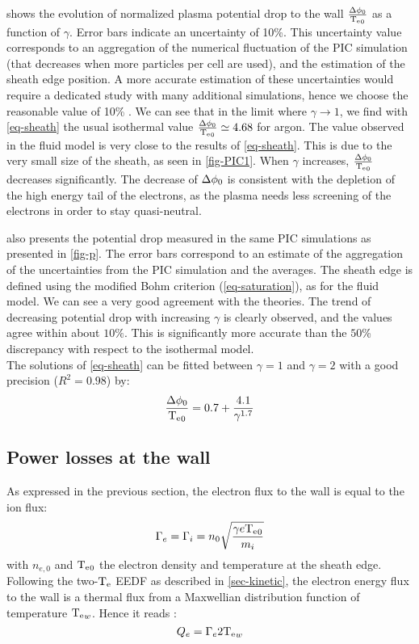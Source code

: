  shows the evolution of normalized plasma potential drop to the wall $\frac{\Delta \phi_0}{\mathrm{T_e}_0}$ as a function of $\gamma$.
{  Error bars indicate an uncertainty of 10\%.
This uncertainty value corresponds to an aggregation of the numerical fluctuation of the PIC simulation (that decreases when more particles per cell are used), and the estimation of the sheath edge position.
A more accurate estimation of these uncertainties would require a dedicated study with many additional simulations, hence we choose the reasonable value of 10\% \citep{turner2013}.}
We can see that in the limit where $\gamma \rightarrow 1$, we find with \cref{eq-sheath} the usual isothermal value $\frac{\Delta \phi_0}{\mathrm{T_e}_0}  \simeq 4.68$ for argon.
The value observed in the fluid model is very close to the results of \cref{eq-sheath}.
This is due to the very small size of the sheath, as seen in \cref{fig-PIC1}.
When $\gamma$ increases, $\frac{\Delta \phi_0}{\mathrm{T_e}_0}$ decreases significantly.
The decrease of $\Delta \phi_0$ is consistent with the depletion of the high energy tail of the electrons, as the plasma needs less screening of the electrons in order to stay quasi-neutral.

 also presents the potential drop measured in the same PIC simulations as presented in \cref{fig-p}.
The error bars correspond to an estimate of the aggregation of the uncertainties from the PIC simulation and the averages.
The sheath edge is defined using the modified Bohm criterion (\cref{eq-saturation}), as for the fluid model.
We can see a very good agreement with the theories.
The trend of decreasing potential drop with increasing $\gamma$ is clearly observed, and the values agree within about $10\%$.
This is significantly more accurate than the $50$\% discrepancy with respect to the isothermal model.\\

The solutions of \cref{eq-sheath} can be fitted between $\gamma = 1$ and $\gamma = 2$ with a good precision ($R^2 = 0.98$) by:
\begin{equation}
  \label{eq-fit}
  \frac{\Delta \phi_0}{\mathrm{T_e}_0} = 0.7 + \frac{4.1}{\gamma^{1.7}}
\end{equation}

\subsection{Power losses at the wall}

As expressed in the previous section, the electron flux to the wall is equal to the ion flux:
\begin{equation}
  \Gamma_e = \Gamma_i =  n_0 \sqrt{\frac{\gamma e \mathrm{T_e}_0}{m_i}}
\end{equation}
with $n_{e,0}$ and $\mathrm{T_e}_0$ the electron density and temperature at the sheath edge.
Following the two-$\mathrm{T_e}$ EEDF as described in \cref{sec-kinetic}, the electron energy flux to the wall is a thermal flux from a Maxwellian distribution function of temperature  $\mathrm{T_e}_w$.
Hence it reads \cite{charbertBook}:
\begin{equation}
  \label{eq-maxflux}
  Q_e = \Gamma_e 2 \mathrm{T_e}_{w}
\end{equation}


